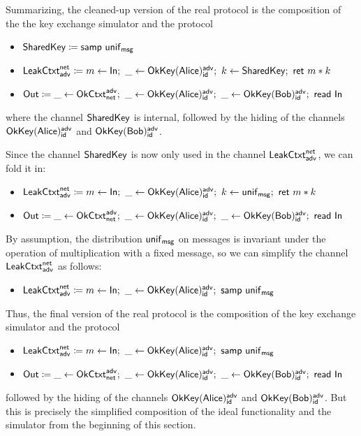 Summarizing, the cleaned-up version of the real protocol is the composition of the the key exchange simulator and the protocol
\begin{itemize}
\item $\mathsf{SharedKey} \coloneqq \mathsf{samp} \ \mathsf{unif}_{\mathsf{msg}}$
\item $\mathsf{LeakCtxt}^{\mathsf{net}}_{\mathsf{adv}} \coloneqq m \leftarrow \mathsf{In}; \ \_ \leftarrow \mathsf{OkKey}(\mathsf{Alice})^{\mathsf{adv}}_{\mathsf{id}}; \ k \leftarrow \mathsf{SharedKey}; \ \mathsf{ret} \ m * k$
\item $\mathsf{Out} \coloneqq \_ \leftarrow \mathsf{OkCtxt}^{\mathsf{adv}}_{\mathsf{net}}; \ \_ \leftarrow \mathsf{OkKey}(\mathsf{Alice})^{\mathsf{adv}}_{\mathsf{id}}; \ \_ \leftarrow \mathsf{OkKey}(\mathsf{Bob})^{\mathsf{adv}}_{\mathsf{id}}; \ \mathsf{read} \ \mathsf{In}$
\end{itemize}
where the channel $\mathsf{SharedKey}$ is internal, followed by the hiding of the channels $\mathsf{OkKey}(\mathsf{Alice})^{\mathsf{adv}}_{\mathsf{id}}$ and $\mathsf{OkKey}(\mathsf{Bob})^{\mathsf{adv}}_{\mathsf{id}}$.

Since the channel $\mathsf{SharedKey}$ is now only used in the channel $\mathsf{LeakCtxt}^{\mathsf{net}}_{\mathsf{adv}}$, we can fold it in:
\begin{itemize}
\item $\mathsf{LeakCtxt}^{\mathsf{net}}_{\mathsf{adv}} \coloneqq m \leftarrow \mathsf{In}; \ \_ \leftarrow \mathsf{OkKey}(\mathsf{Alice})^{\mathsf{adv}}_{\mathsf{id}}; \ k \leftarrow \mathsf{unif}_{\mathsf{msg}}; \ \mathsf{ret} \ m * k$
\item $\mathsf{Out} \coloneqq \_ \leftarrow \mathsf{OkCtxt}^{\mathsf{adv}}_{\mathsf{net}}; \ \_ \leftarrow \mathsf{OkKey}(\mathsf{Alice})^{\mathsf{adv}}_{\mathsf{id}}; \ \_ \leftarrow \mathsf{OkKey}(\mathsf{Bob})^{\mathsf{adv}}_{\mathsf{id}}; \ \mathsf{read} \ \mathsf{In}$
\end{itemize}

By assumption, the distribution $\mathsf{unif}_{\mathsf{msg}}$ on messages is invariant under the operation of multiplication with a fixed message, so we can simplify the channel $\mathsf{LeakCtxt}^{\mathsf{net}}_{\mathsf{adv}}$ as follows:
\begin{itemize}
\item $\LeakCtxt^\net_\adv \coloneqq m \leftarrow \In; \ \_ \leftarrow \OkKey(\Alice)^\adv_\id; \ \samp{\unif_\msg}$
\end{itemize}

Thus, the final version of the real protocol is the composition of the key exchange simulator and the protocol
\begin{itemize}
\item $\LeakCtxt^\net_\adv \coloneqq m \leftarrow \In; \ \_ \leftarrow \OkKey(\Alice)^\adv_\id; \ \samp{\unif_\msg}$
\item $\mathsf{Out} \coloneqq \_ \leftarrow \mathsf{OkCtxt}^{\mathsf{adv}}_{\mathsf{net}}; \ \_ \leftarrow \mathsf{OkKey}(\mathsf{Alice})^{\mathsf{adv}}_{\mathsf{id}}; \ \_ \leftarrow \mathsf{OkKey}(\mathsf{Bob})^{\mathsf{adv}}_{\mathsf{id}}; \ \mathsf{read} \ \mathsf{In}$
\end{itemize}
followed by the hiding of the channels $\mathsf{OkKey}(\mathsf{Alice})^{\mathsf{adv}}_{\mathsf{id}}$ and $\mathsf{OkKey}(\mathsf{Bob})^{\mathsf{adv}}_{\mathsf{id}}$. But this is precisely the simplified composition of the ideal functionality and the simulator from the beginning of this section.